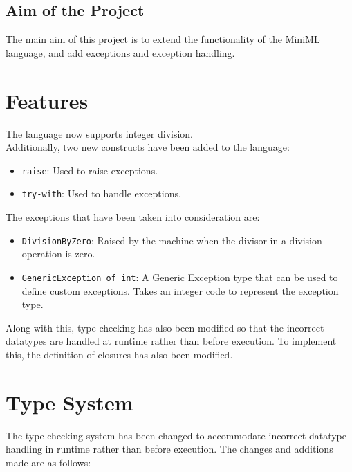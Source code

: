 \documentclass{article}
\begin{document}
    \subsection{Aim of the Project}
        The main aim of this project is to extend the functionality of the MiniML language,
        and add exceptions and exception handling.
    
\section{Features}
    The language now supports integer division.\\
    Additionally, two new constructs have been added to the language:
    \begin{itemize}
        \item \texttt{raise}: Used to raise exceptions.
        \item \texttt{try-with}: Used to handle exceptions.
    \end{itemize}

    The exceptions that have been taken into consideration are:
    \begin{itemize}
        \item \texttt{DivisionByZero}: Raised by the machine when the divisor in a division operation is zero.
        \item \texttt{GenericException of int}: A Generic Exception type that can be used to define custom exceptions. Takes an integer code to represent the exception type.
    \end{itemize}

    Along with this, type checking has also been modified so that the incorrect datatypes are handled at runtime rather than before execution. To implement this, the definition of closures has also been modified.

\newpage
\section{Type System}
    The type checking system has been changed to accommodate incorrect datatype handling in runtime rather than before execution.
    The changes and additions made are as follows:
\end{document}

